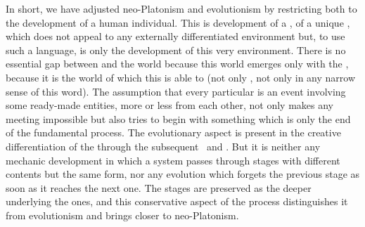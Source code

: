 \pa In short, we have adjusted neo-Platonism and evolutionism by restricting
both to the development of a human individual. This is development of a
, of a unique , which does not appeal to any externally
differentiated environment but, to use such a language, is only the development
of this very environment.  There is no essential gap between  and
the world because this world emerges only with the , because it is
the world of  which this  is able to
 (not only , not only  in any narrow
sense of this word). The  assumption that every particular
 is an event involving some ready-made entities,  more
or less  from each other, not only makes any meeting impossible
but also tries to begin with something which is only the end of the fundamental
process.  The evolutionary aspect is present in the creative differentiation of
the  through the subsequent \nexuss\ and . But
it is neither any mechanic development in which a system passes through stages
with different contents but the same form, nor any  evolution
which forgets the previous stage as soon as it reaches the next one. The
 stages are preserved as the deeper  underlying the
 ones, and this conservative aspect of the process distinguishes
it from evolutionism and brings closer to neo-Platonism.


